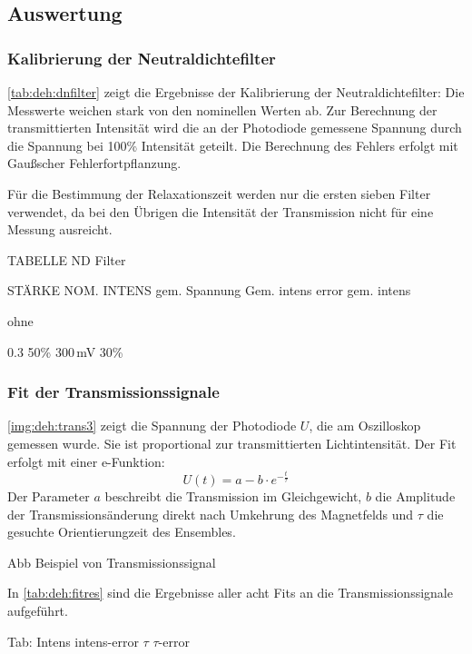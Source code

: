 \subsection{Auswertung}

\subsubsection*{Kalibrierung der Neutraldichtefilter}

\autoref{tab:deh:dnfilter} zeigt die Ergebnisse der Kalibrierung der Neutraldichtefilter:
Die Messwerte weichen stark von den nominellen Werten ab.
Zur Berechnung der transmittierten Intensität wird die an der Photodiode gemessene Spannung
durch die Spannung bei 100\% Intensität geteilt.
Die Berechnung des Fehlers erfolgt mit Gaußscher Fehlerfortpflanzung.

Für die Bestimmung der Relaxationszeit werden nur die ersten sieben Filter verwendet,
da bei den Übrigen die Intensität der Transmission nicht für eine Messung ausreicht.


TABELLE ND Filter


STÄRKE		NOM. INTENS 	gem. Spannung		Gem. intens 	error gem. intens

ohne 

0.3	 			50\%			300\,mV				30\%


\subsubsection*{Fit der Transmissionssignale}
\autoref{img:deh:trans3} zeigt die Spannung der Photodiode $U$, die am Oszilloskop gemessen wurde.
Sie ist proportional zur transmittierten Lichtintensität.
Der Fit erfolgt mit einer e-Funktion:
\begin{equation}
  U(t)=a - b \cdot e^{-\frac{t}{\tau}}
\end{equation}
Der Parameter $a$ beschreibt die Transmission im Gleichgewicht, $b$ die Amplitude der
Transmissionsänderung direkt nach Umkehrung des Magnetfelds und $\tau$ die gesuchte Orientierungzeit des Ensembles.


Abb Beispiel von Transmissionssignal
 

In \autoref{tab:deh:fitres} sind die Ergebnisse aller acht Fits an die Transmissionssignale aufgeführt.

Tab:
Intens		intens-error	$\tau$		$\tau$-error
 

